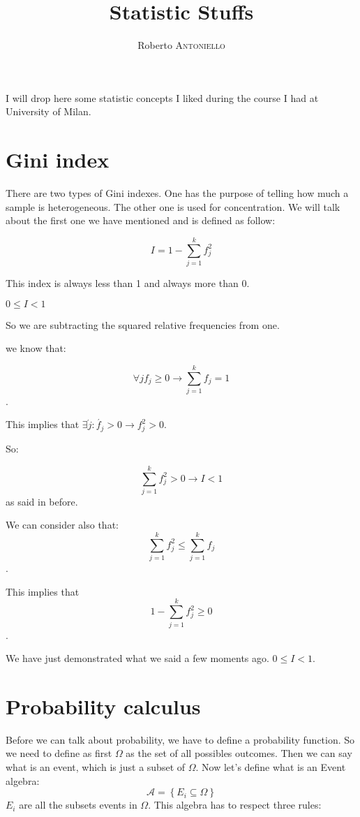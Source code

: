 \documentclass{article}
\title{Statistic Stuffs}
\author{Roberto \textsc{Antoniello}}
\begin{document}
\maketitle

\begin{center} I will drop here some statistic concepts I liked during the course I had at University of Milan.\end{center}

\section{Gini index}

There are two types of Gini indexes. One has the purpose of telling how much a sample is heterogeneous. The other one is used for concentration. We will talk about the first one we have mentioned and is defined as follow:
\begin{center}$$I = 1 - \sum_{j=1}^{k}f_j^2$$\end{center}

This index is always less than 1 and always more than 0.

\begin{center}$0 \leq I < 1$\end{center}

So we are subtracting the squared relative frequencies from one. 

we know that: 
\begin{center}$$\forall j f_j \ge 0 \longrightarrow \sum_{j=1}^k f_j = 1$$.\end{center}

This implies that $\exists \acute{j} : \acute{f_j} > 0 \longrightarrow f_j^2 > 0$.

So: \begin{center}$$\sum_{j=1}^k f_j^2 > 0 \longrightarrow I < 1$$ as said in before.\end{center}

We can consider also that: $$\sum_{j=1}^kf_j^2 \le \sum_{j=1}^kf_j$$.

This implies that $$1 - \sum_{j=1}^kf_j^2 \ge 0$$.

We have just demonstrated what we said a few moments ago. $0 \leq I < 1$.  

\section{Probability calculus}

Before we can talk about probability, we have to define a probability function. So we need to define as first $\Omega$ as the set of all possibles outcomes. Then we can say what is an event, which is just a subset of $\Omega$. Now let's define what is an Event algebra:
$$\mathcal{A} = \left\{E_i \subseteq \Omega\right\}$$
$E_i$ are all the subsets events in $\Omega$. This algebra has to respect three rules:
\end{document}

